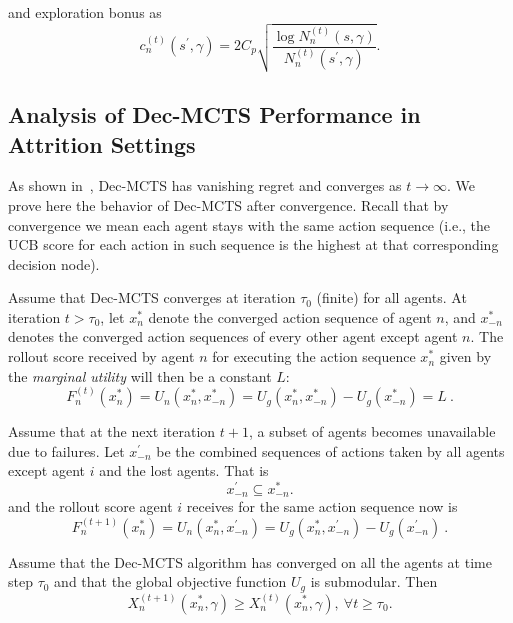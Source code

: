 and exploration bonus as
\begin{equation}
\label{eq:exploration}
c_n^{(t)}(s^\prime, \gamma) = 2C_p \sqrt{\frac{\log N_n^{(t)}(s,\gamma) }{N_n^{(t)}(s^{\prime},\gamma)}}.
\end{equation} 

\subsection{Analysis of Dec-MCTS Performance in Attrition Settings}

As shown in~\citep{best2019dec}, Dec-MCTS has vanishing regret and converges as $t \rightarrow \infty$. We prove here the behavior of Dec-MCTS after convergence. Recall that by convergence we mean each agent stays with the same action sequence (i.e., the UCB score for each action in such sequence is the highest at that corresponding decision node).

Assume that Dec-MCTS converges at iteration $\tau_0$ (finite) for all agents. At iteration $t > \tau_0$, let $x^*_n$ denote the converged action sequence of agent $n$, and $x^*_{-n}$ denotes the converged action sequences of every other agent except agent $n$. The rollout score received by agent $n$ for executing the action sequence $x^*_n$ given by the \emph{marginal utility }will then be a constant $L$:
\begin{equation}
\label{eq:converged_rollout}
F_n^{(t)}(x^*_n) = U_n(x^*_n,x^*_{-n}) = U_g(x^*_n,x^*_{-n}) - U_g(x^*_{-n}) = L \ .
\end{equation}

Assume that at the next iteration $t+1$, a subset of agents becomes unavailable due to failures. Let $x^\prime_{-n}$ be the combined sequences of actions taken by all agents except agent $i$ and the lost agents. That is
$$x^\prime_{-n} \subseteq x^*_{-n}.$$
and the rollout score agent $i$ receives for the same action sequence now is
\begin{equation} \label{eq:A}
    F_n^{(t+1)} (x^*_n) = U_n(x^*_n,x^\prime_{-n}) = U_g(x^*_n,x^\prime_{-n}) - U_g(x^\prime_{-n})\ .
\end{equation}

\begin{lemma}\label{le:suboptimality}
Assume that the Dec-MCTS algorithm has converged on all the agents at time step $\tau_0$ and that the global objective function $U_g$ is submodular. Then
$$X_n^{(t+1)}(x^*_n,\gamma) \geq X_n^{(t)}(x^*_n,\gamma),\ \forall t \geq \tau_0.$$ 
\end{lemma}


